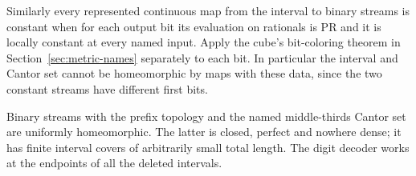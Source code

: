 Similarly every represented continuous map from the interval to binary
streams is constant when for each output bit its evaluation on rationals
is PR and it is locally constant at every named input. Apply the cube's
bit-coloring theorem in Section~\ref{sec:metric-names} separately to each
bit. In particular the interval and Cantor set cannot be homeomorphic
by maps with these data, since the two constant streams have different
first bits.

\begin{theorem}\label{idx-cantor69}
Binary streams with the prefix topology and the named middle-thirds Cantor
set are uniformly homeomorphic. The latter is closed, perfect and nowhere
dense; it has finite interval covers of arbitrarily small total length.
The digit decoder works at the endpoints of all the deleted intervals.
\end{theorem}
